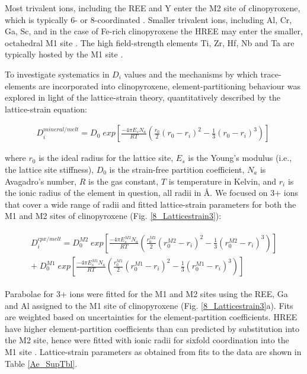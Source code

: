 \documentclass[review,authoryear,12pt]{elsarticle}
\begin{document}
Most trivalent ions, including the REE and Y enter the M2 site of clinopyroxene, which is typically 6- or 8-coordinated \citep{Deer1992}. Smaller trivalent ions, including Al, Cr, Ga, Sc, and in the case of Fe-rich clinopyroxene the HREE may enter the smaller, octahedral M1 site \citep{Olin2010, Bedard2014}. The high field-strength elements Ti, Zr, Hf, Nb and Ta are typically hosted by the M1 site \citep{Hill2000, Hill2011, Dygert2014}.

To investigate systematics in $D_i$ values and the mechanisms by which trace-elements are incorporated into clinopyroxene, element-partitioning behaviour was explored in light of the lattice-strain theory, quantitatively described by the lattice-strain equation: 

	\begin{align} %
	   D_i^{mineral/melt} = D_0 \; exp \left[\frac{-4\pi E_sN_a}{RT} \left(\frac{r_0}{2}(r_0-r_i)^2-\frac{1}{3}(r_0-r_i)^3\right)\right]\
	   \label{LST_eqn}
	\end{align}
	
\noindent where $r_0$ is the ideal radius for the lattice site, $E_s$ is the Young's modulus (i.e., the lattice site stiffness), $D_0$ is the strain-free partition coefficient, $N_a$ is Avagadro's number, $R$ is the gas constant, $T$ is temperature in Kelvin, and $r_i$ is the ionic radius of the element in question, all radii in \si{\angstrom}. We focused on 3+ ions that cover a wide range of radii and fitted lattice-strain parameters for both the M1 and M2 sites of clinopyroxene (Fig. \ref{8_Latticestrain3}):
		
	\begin{align} %
	\begin{split}
	   D_i^{cpx/melt} = D_0^{M2} \; exp \left[\frac{-4\pi E_s^{M2} N_a}{RT} \left(\frac{r_0^{M2}}{2}(r_0^{M2}-r_i)^2-\frac{1}{3}(r_0^{M2}-r_i)^3\right)\right] \\
  + \; D_0^{M1} \; exp \left[\frac{-4\pi E_s^{M1} N_a}{RT} \left(\frac{r_0^{M1}}{2}(r_0^{M1}-r_i)^2-\frac{1}{3}(r_0^{M1}-r_i)^3\right)\right]\
	\end{split}
	\label{LST_eqn_cpx}
	\end{align}
	
	\noindent Parabolae for 3+ ions were fitted for the M1 and M2 sites using the REE, Ga and Al assigned to the M1 site of clinopyroxene (Fig. \ref{8_Latticestrain3}a). Fits are weighted based on uncertainties for the element-partition coefficients. HREE have higher element-partition coefficients than can predicted by substitution into the M2 site, hence were fitted with ionic radii for sixfold coordination into the M1 site \citep[\textit{cf.}][]{Olin2010, Reguir2012}.
	Lattice-strain parameters as obtained from fits to the data are shown in Table \ref{Ae_SupTbl}.
	
\end{document}
